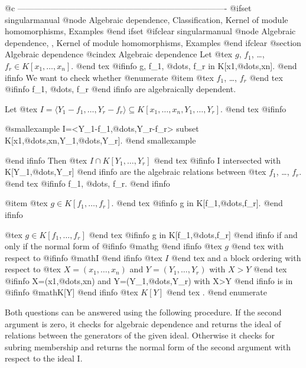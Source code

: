@c ----------------------------------------------------------------------------
@ifset singularmanual
@node Algebraic dependence, Classification, Kernel of module homomorphisms, Examples
@end ifset
@ifclear singularmanual
@node Algebraic dependence,  , Kernel of module homomorphisms, Examples
@end ifclear
@section Algebraic dependence
@cindex Algebraic dependence
Let
@tex
$g$, $f_1$, \dots, $f_r\in K[x_1,\ldots,x_n]$.
@end tex
@ifinfo
g, f_1, @dots{}, f_r in K[x1,@dots{},xn].
@end ifinfo
We want to check whether
@enumerate
@item
@tex
$f_1$, \dots, $f_r$
@end tex
@ifinfo
f_1, @dots{}, f_r
@end ifinfo
are algebraically dependent.

Let
@tex
$I=\langle Y_1-f_1,\ldots,Y_r-f_r \rangle \subseteq
K[x_1,\ldots,x_n,Y_1,\ldots,Y_r]$.
@end tex
@ifinfo

@smallexample
I=<Y_1-f_1,@dots{},Y_r-f_r> subset K[x1,@dots{},xn,Y_1,@dots{},Y_r].
@end smallexample

@end ifinfo
Then
@tex
$I \cap K[Y_1,\ldots,Y_r]$
@end tex
@ifinfo
I intersected with K[Y_1,@dots{},Y_r]
@end ifinfo
are the algebraic relations between
@tex
$f_1$, \dots, $f_r$.
@end tex
@ifinfo
f_1, @dots{}, f_r.
@end ifinfo

@item
@tex
$g \in K [f_1,\ldots,f_r]$.
@end tex
@ifinfo
g in K[f_1,@dots{},f_r].
@end ifinfo

@tex
$g \in K[f_1,\ldots,f_r]$
@end tex
@ifinfo
g in K[f_1,@dots{},f_r]
@end ifinfo
if and only if the normal form of 
@ifinfo
@math{g}
@end ifinfo
@tex
$g$
@end tex
 with respect to 
@ifinfo
@math{I}
@end ifinfo
@tex
$I$
@end tex
 and a
block ordering with respect to
@tex
$X=(x_1,\ldots,x_n)$ and $Y=(Y_1,\ldots,Y_r)$ with $X>Y$
@end tex
@ifinfo
X=(x1,@dots{},xn) and Y=(Y_1,@dots{},Y_r) with X>Y
@end ifinfo
is in 
@ifinfo
@math{K[Y]}
@end ifinfo
@tex
$K[Y]$
@end tex
.
@end enumerate

Both questions can be answered using the following procedure. If the
second argument is zero, it checks for algebraic dependence and returns
the ideal of relations between the generators of the given ideal.
Otherwise it checks for subring membership and returns the normal form
of the second argument with respect to the ideal I.

